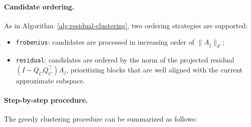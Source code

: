 \documentclass[10pt]{article} %
\begin{document}
\paragraph{Candidate ordering.}
As in Algorithm~\ref{alg:residual-clustering}, two ordering strategies are
supported:
\begin{itemize}
  \item \texttt{frobenius}: candidates are processed in increasing order of
  $\|A_j\|_F$;
  \item \texttt{residual}: candidates are ordered by the norm of the projected
  residual $(I - Q_C Q_C^\top)A_j$, prioritizing blocks that are well aligned
  with the current approximate subspace.
\end{itemize}

\paragraph{Step-by-step procedure.}
The greedy clustering procedure can be summarized as follows:
\end{document}
